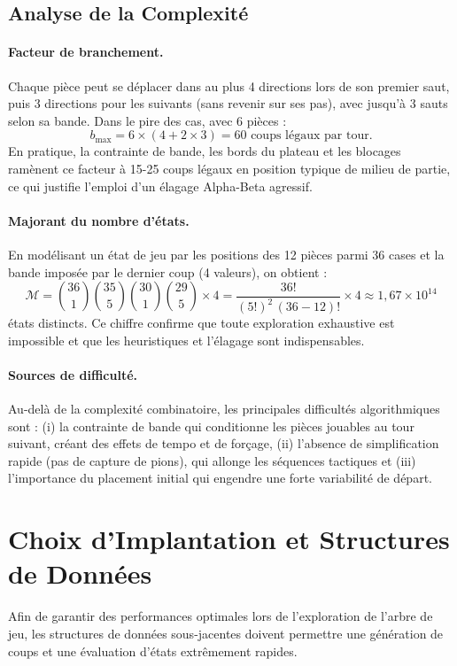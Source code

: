 \documentclass[12pt,a4paper]{article}
\begin{document}
\subsection{Analyse de la Complexité}
\paragraph{Facteur de branchement.}
Chaque pièce peut se déplacer dans au plus 4 directions lors de son premier saut, puis 3 directions pour les suivants (sans revenir sur ses pas), avec jusqu'à 3 sauts selon sa bande. Dans le pire des cas, avec 6 pièces :
\[
b_{\max} = 6 \times (4 + 2 \times 3) = 60 \text{ coups légaux par tour.}
\]
En pratique, la contrainte de bande, les bords du plateau et les blocages ramènent ce facteur à 15-25 coups légaux en position typique de milieu de partie, ce qui justifie l'emploi d'un élagage Alpha-Beta agressif.

\paragraph{Majorant du nombre d'états.}
En modélisant un état de jeu par les positions des 12 pièces parmi 36 cases et la bande imposée par le dernier coup (4 valeurs), on obtient :
\[
\mathcal{M} = \binom{36}{1}\binom{35}{5}\binom{30}{1}\binom{29}{5} \times 4 = \frac{36!}{(5!)^2\,(36-12)!} \times 4 \approx 1{,}67 \times 10^{14}
\]
états distincts. Ce chiffre confirme que toute exploration exhaustive est impossible et que les heuristiques et l'élagage sont indispensables.

\paragraph{Sources de difficulté.}
Au-delà de la complexité combinatoire, les principales difficultés algorithmiques sont : (i) la contrainte de bande qui conditionne les pièces jouables au tour suivant, créant des effets de tempo et de forçage, (ii) l'absence de simplification rapide (pas de capture de pions), qui allonge les séquences tactiques et (iii) l'importance du placement initial qui engendre une forte variabilité de départ.





\section{Choix d'Implantation et Structures de Données}
Afin de garantir des performances optimales lors de l'exploration de l'arbre de jeu, les structures de données sous-jacentes doivent permettre une génération de coups et une évaluation d'états extrêmement rapides.
\end{document}
